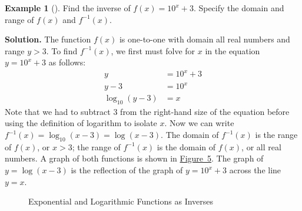 \documentclass[10pt,]{book}
\theoremstyle{plain}
\theoremstyle{definition}
\theoremstyle{definition}
\newtheorem{example}[theorem]{Example}
\theoremstyle{definition}
\numberwithin{equation}{section}
\newcommand{\amp}{&}
\begin{document}
\begin{example}[]\label{example-25}
\hypertarget{p-329}{}%
Find the inverse of \(f(x) = 10^x + 3\). Specify the domain and range of \(f(x)\) and \(f^{-1}(x)\).%
\par\smallskip%
\noindent\textbf{Solution.}\hypertarget{solution-25}{}\quad%
\hypertarget{p-330}{}%
The function \(f(x)\) is one-to-one with domain all real numbers and range \(y > 3\). To find \(f^{-1}(x)\), we first must folve for \(x\) in the equation \(y = 10^x + 3\) as follows:%
\begin{align*}
y \amp= 10^x + 3\\
y - 3 \amp= 10^x\\
\log_{10} \left( y - 3 \right) \amp= x
\end{align*}
Note that we had to subtract \(3\) from the right-hand size of the equation before using the definition of logarithm to isolate \(x\). Now we can write \(f^{-1}(x) = \log_{10} \left( x - 3 \right) = \log \left( x - 3 \right) \). The domain of \(f^{-1}(x)\) is the range of \(f(x)\), or \(x > 3\); the range of \(f^{-1}(x)\) is the domain of \(f(x)\), or all real numbers. A graph of both functions is shown in \hyperref[exponential-log-inverses-example]{Figure~5}. The graph of \(y = \log \left( x - 3 \right)\) is the reflection of the graph of \(y = 10^x + 3\) across the line \(y = x\).%
\begin{figure}
\centering
{
}
\caption{Exponential and Logarithmic Functions as Inverses\label{exponential-log-inverses-example}}
\end{figure}
\end{example}
\typeout{************************************************}
\typeout{************************************************}
\end{document}
